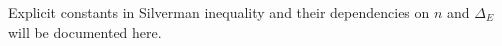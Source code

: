 
Explicit constants in Silverman inequality and their dependencies on $n$ and $\Delta_E$ will be documented here. 